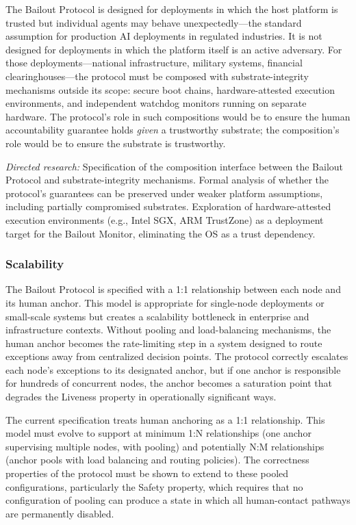 The Bailout Protocol is designed for deployments in which the host platform is trusted but individual agents may behave unexpectedly---the standard assumption for production AI deployments in regulated industries. It is not designed for deployments in which the platform itself is an active adversary. For those deployments---national infrastructure, military systems, financial clearinghouses---the protocol must be composed with substrate-integrity mechanisms outside its scope: secure boot chains, hardware-attested execution environments, and independent watchdog monitors running on separate hardware. The protocol's role in such compositions would be to ensure the human accountability guarantee holds \emph{given} a trustworthy substrate; the composition's role would be to ensure the substrate is trustworthy.

\textit{Directed research:} Specification of the composition interface between the Bailout Protocol and substrate-integrity mechanisms. Formal analysis of whether the protocol's guarantees can be preserved under weaker platform assumptions, including partially compromised substrates. Exploration of hardware-attested execution environments (e.g., Intel SGX, ARM TrustZone) as a deployment target for the Bailout Monitor, eliminating the OS as a trust dependency.

\subsubsection{Scalability}

The Bailout Protocol is specified with a 1:1 relationship between each node and its human anchor. This model is appropriate for single-node deployments or small-scale systems but creates a scalability bottleneck in enterprise and infrastructure contexts. Without pooling and load-balancing mechanisms, the human anchor becomes the rate-limiting step in a system designed to route exceptions away from centralized decision points. The protocol correctly escalates each node's exceptions to its designated anchor, but if one anchor is responsible for hundreds of concurrent nodes, the anchor becomes a saturation point that degrades the Liveness property in operationally significant ways.

The current specification treats human anchoring as a 1:1 relationship. This model must evolve to support at minimum 1:N relationships (one anchor supervising multiple nodes, with pooling) and potentially N:M relationships (anchor pools with load balancing and routing policies). The correctness properties of the protocol must be shown to extend to these pooled configurations, particularly the Safety property, which requires that no configuration of pooling can produce a state in which all human-contact pathways are permanently disabled.

